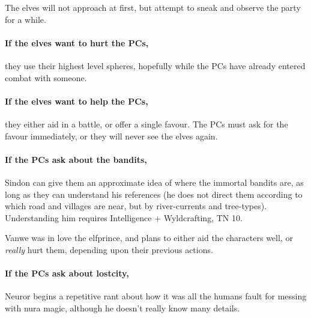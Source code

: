 \begin{multicols}{2}
The elves will not approach at first, but attempt to sneak and observe the party for a while.

\paragraph{If the elves want to hurt the PCs,}
they use their highest level spheres, hopefully while the PCs have already entered combat with someone.

\paragraph{If the elves want to help the PCs,}
they either aid in a battle, or offer a single favour.
The PCs must ask for the favour immediately, or they will never see the elves again.


\paragraph{If the PCs ask about the bandits,}
Sindon can give them an approximate idea of where the immortal bandits are, as long as they can understand his references (he does not direct them according to which road and villages are near, but by river-currents and tree-types).
Understanding him requires Intelligence + Wyldcrafting, TN 10.


Vanwe was in love the \gls{elfprince}, and plans to either aid the characters well, or \emph{really} hurt them, depending upon their previous actions.

\label{neuror}

\paragraph{If the PCs ask about \gls{lostcity},}
Neuror begins a repetitive rant about how it was all the humans fault for messing with nura magic, although he doesn't really know many details.

\stopcontents[sq]

\resumecontents[Villages]
\stopcontents[Villages]

\startcontents[sq]

\sqminitoc


\end{multicols}
